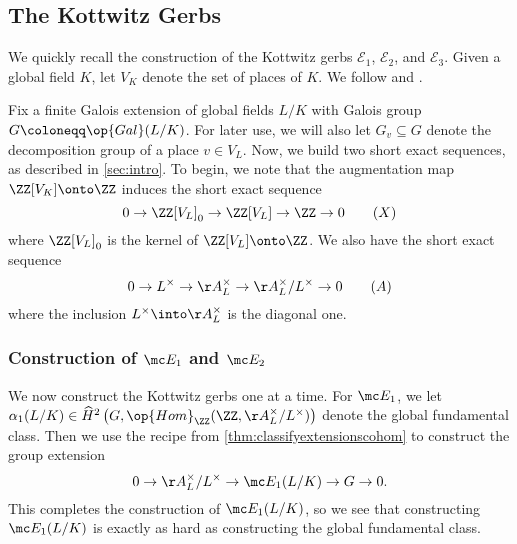 \subsection{The Kottwitz Gerbs} \label{sec:globalsetup}
We quickly recall the construction of the Kottwitz gerbs $\mathcal E_1$, $\mathcal E_2$, and $\mathcal E_3$. Given a global field $K$, let $V_K$ denote the set of places of $K$. We follow \cite{kottwitz} and \cite{tate-torus}.

Fix a finite Galois extension of global fields $L/K$ with Galois group $G\coloneqq\op{Gal}(L/K)$. For later use, we will also let $G_v\subseteq G$ denote the decomposition group of a place $v\in V_L$. Now, we build two short exact sequences, as described in \autoref{sec:intro}. To begin, we note that the augmentation map $\ZZ[V_K]\onto\ZZ$ induces the short exact sequence
\[0\to\ZZ[V_L]_0\to\ZZ[V_L]\to\ZZ\to0\label{eq:sesx}\tag{$X$}\]
where $\ZZ[V_L]_0$ is the kernel of $\ZZ[V_L]\onto\ZZ$. We also have the short exact sequence
\[0\to L^\times\to\AA_L^\times\to\AA_L^\times/L^\times\to0\tag{$A$}\label{eq:sesa}\]
where the inclusion $L^\times\into\AA_L^\times$ is the diagonal one.

\subsubsection{Construction of \texorpdfstring{$\mc E_1$ and $\mc E_2$}{ E1 and E2}}
We now construct the Kottwitz gerbs one at a time. For $\mc E_1$, we let $\alpha_1(L/K)\in\widehat H^2\left(G,\op{Hom}_\ZZ(\ZZ,\AA_L^\times/L^\times)\right)$ denote the global fundamental class. Then we use the recipe from \autoref{thm:classifyextensionscohom} to construct the group extension
\[0\to\AA_L^\times/L^\times\to\mc E_1(L/K)\to G\to0.\]
This completes the construction of $\mc E_1(L/K)$, so we see that constructing $\mc E_1(L/K)$ is exactly as hard as constructing the global fundamental class.

